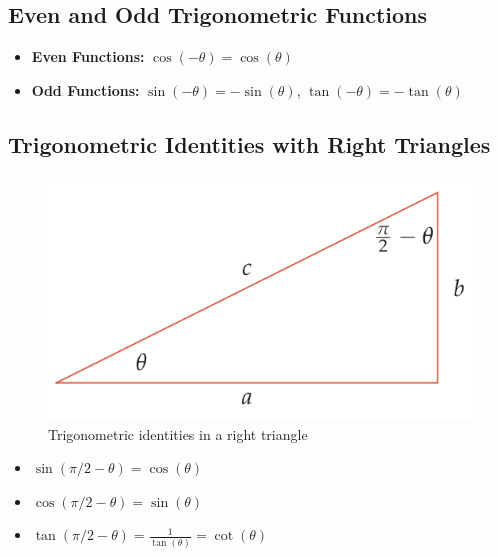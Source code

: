 \subsection{Even and Odd Trigonometric Functions}
\begin{itemize}
    \item \textbf{Even Functions:} $\cos(-\theta) = \cos(\theta)$
    \item \textbf{Odd Functions:} $\sin(-\theta) = -\sin(\theta)$, $\tan(-\theta) = -\tan(\theta) $
\end{itemize}

\subsection{Trigonometric Identities with Right Triangles}
\begin{figure}
    \centering
    \includegraphics[scale=0.4]{pics/15.png}
    \caption{Trigonometric identities in a right triangle}
\end{figure}
\begin{itemize}
    \item  $\sin(\pi/2 - \theta) = \cos(\theta)$
    \item $\cos(\pi/2 - \theta) = \sin(\theta)$
    \item $\tan(\pi/2 - \theta) = \frac{1}{\tan(\theta)} = \cot(\theta)$
\end{itemize}

